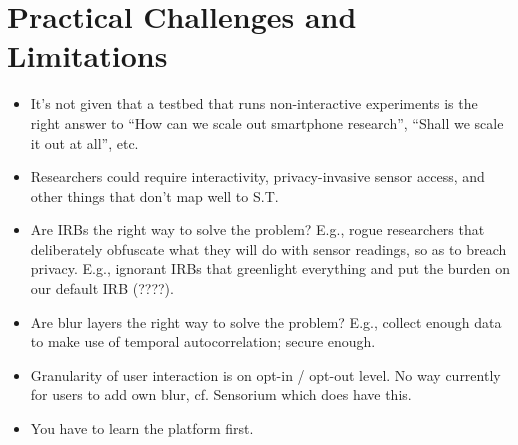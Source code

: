 \section{Practical Challenges and Limitations}\label{sec-limitation}

\begin{itemize}
  \item It's not given that a testbed that runs non-interactive 
experiments is the right answer to ``How can we scale out 
smartphone research'', ``Shall we scale it out at all'', etc.
  \item Researchers could require interactivity, privacy-invasive 
sensor access, and other things that don't map well to S.T.
  \item Are IRBs the right way to solve the problem? E.g., 
rogue researchers that deliberately obfuscate what they will 
do with sensor readings, so as to breach privacy. E.g., 
ignorant IRBs that greenlight everything and put the burden on 
our default IRB (????).
  \item Are blur layers the right way to solve the problem? E.g., 
collect enough data to make use of temporal autocorrelation; secure enough.
  \item Granularity of user interaction is on opt-in / opt-out 
level. No way currently for users to add own blur, cf. Sensorium 
which does have this.
  \item You have to learn the platform first.
\end{itemize}

